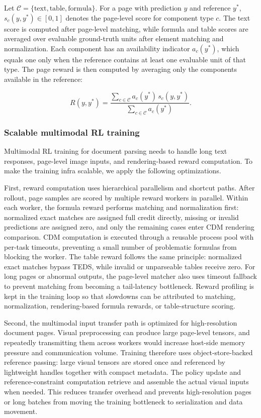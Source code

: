 Let \(\mathcal{C}=\{\mathrm{text},\mathrm{table},\mathrm{formula}\}\). For a page with prediction \(y\) and reference \(y^\ast\), \(s_c(y,y^\ast)\in[0,1]\) denotes the page-level score for component type \(c\). The text score is computed after page-level matching, while formula and table scores are averaged over evaluable ground-truth units after element matching and normalization. Each component has an availability indicator \(a_c(y^\ast)\), which equals one only when the reference contains at least one evaluable unit of that type. The page reward is then computed by averaging only the components available in the reference:

\[
R(y,y^\ast)
=
\frac{
\sum_{c\in\mathcal{C}} a_c(y^\ast)\,s_c(y,y^\ast)
}{
\sum_{c\in\mathcal{C}} a_c(y^\ast)
}.
\]

\subsubsection{Scalable multimodal RL training}

Multimodal RL training for document parsing needs to handle long text responses, page-level image inputs, and rendering-based reward computation. To make the training infra scalable, we apply the following optimizations.

First, reward computation uses hierarchical parallelism and shortcut paths. After rollout, page samples are scored by multiple reward workers in parallel. Within each worker, the formula reward performs matching and normalization first: normalized exact matches are assigned full credit directly, missing or invalid predictions are assigned zero, and only the remaining cases enter CDM rendering comparison. CDM computation is executed through a reusable process pool with per-task timeouts, preventing a small number of problematic formulas from blocking the worker. The table reward follows the same principle: normalized exact matches bypass TEDS, while invalid or unparseable tables receive zero. For long pages or abnormal outputs, the page-level matcher also uses timeout fallback to prevent matching from becoming a tail-latency bottleneck. Reward profiling is kept in the training loop so that slowdowns can be attributed to matching, normalization, rendering-based formula rewards, or table-structure scoring.

Second, the multimodal input transfer path is optimized for high-resolution document pages. Visual preprocessing can produce large page-level tensors, and repeatedly transmitting them across workers would increase host-side memory pressure and communication volume. Training therefore uses object-store-backed reference passing: large visual tensors are stored once and referenced by lightweight handles together with compact metadata. The policy update and reference-constraint computation retrieve and assemble the actual visual inputs when needed. This reduces transfer overhead and prevents high-resolution pages or long batches from moving the training bottleneck to serialization and data movement.

